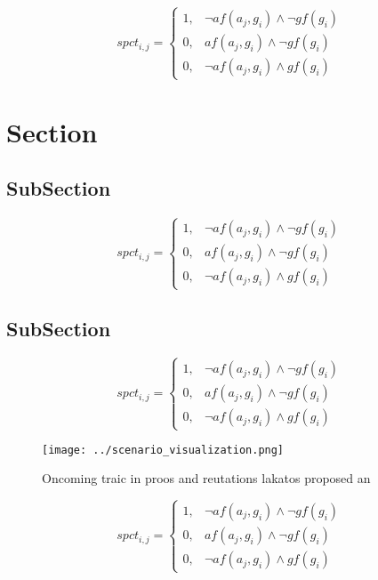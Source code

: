 \documentclass[a4paper]{article}
\begin{document}
\begin{equation}
spct_{i,j} =
\begin{cases}
1, & \text{$\neg af(a_j,g_i) \wedge \neg gf(g_i)$}\\
0, & \text{$af(a_j,g_i) \wedge \neg gf(g_i)$}\\
0, & \text{$\neg af(a_j,g_i) \wedge gf(g_i)$}
\end{cases}
\end{equation}

\section{Section}

\subsection{SubSection}

\begin{equation}
spct_{i,j} =
\begin{cases}
1, & \text{$\neg af(a_j,g_i) \wedge \neg gf(g_i)$}\\
0, & \text{$af(a_j,g_i) \wedge \neg gf(g_i)$}\\
0, & \text{$\neg af(a_j,g_i) \wedge gf(g_i)$}
\end{cases}
\end{equation}

\subsection{SubSection}

\begin{equation}
spct_{i,j} =
\begin{cases}
1, & \text{$\neg af(a_j,g_i) \wedge \neg gf(g_i)$}\\
0, & \text{$af(a_j,g_i) \wedge \neg gf(g_i)$}\\
0, & \text{$\neg af(a_j,g_i) \wedge gf(g_i)$}
\end{cases}
\end{equation}

\begin{figure}
\centering
\texttt{[image: ../scenario\_visualization.png]}
\caption{Oncoming traic in proos and reutations lakatos proposed an 
}
\end{figure}
 
\begin{equation}
spct_{i,j} =
\begin{cases}
1, & \text{$\neg af(a_j,g_i) \wedge \neg gf(g_i)$}\\
0, & \text{$af(a_j,g_i) \wedge \neg gf(g_i)$}\\
0, & \text{$\neg af(a_j,g_i) \wedge gf(g_i)$}
\end{cases}
\end{equation}
\end{document}
